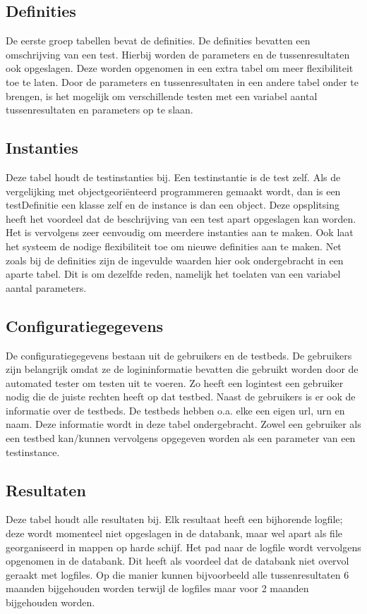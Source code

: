 \subsection{Definities}
\npar
De eerste groep tabellen bevat de definities. De definities bevatten een omschrijving van een test. Hierbij worden de parameters en de tussenresultaten ook opgeslagen. Deze worden opgenomen in een extra tabel om meer flexibiliteit toe te laten. Door de parameters en tussenresultaten in een andere tabel onder te brengen, is het mogelijk om verschillende testen met een variabel aantal tussenresultaten en parameters op te slaan.
\subsection{Instanties}
\npar
Deze tabel houdt de testinstanties bij. Een testinstantie is de test zelf. Als de vergelijking met objectgeori\"enteerd programmeren gemaakt wordt, dan is een testDefinitie een klasse zelf en de instance is dan een object. Deze opsplitsing heeft het voordeel dat de beschrijving van een test apart opgeslagen kan worden. Het is vervolgens zeer eenvoudig om meerdere instanties aan te maken. Ook laat het systeem de nodige flexibiliteit toe om nieuwe definities aan te maken. Net zoals bij de definities zijn de ingevulde waarden hier ook ondergebracht in een aparte tabel. Dit is om dezelfde reden, namelijk het toelaten van een variabel aantal parameters.
\subsection{Configuratiegegevens}
\npar
De configuratiegegevens bestaan uit de gebruikers en de testbeds. De gebruikers zijn belangrijk omdat ze de logininformatie bevatten die gebruikt worden door de automated tester om testen uit te voeren. Zo heeft een logintest een gebruiker nodig die de juiste rechten heeft op dat testbed.
Naast de gebruikers is er ook de informatie over de testbeds. De testbeds hebben o.a. elke een eigen url, urn en naam. Deze informatie wordt in deze tabel ondergebracht. Zowel een gebruiker als een testbed kan/kunnen vervolgens opgegeven worden als een parameter van een testinstance. 
\subsection{Resultaten}
\npar
Deze tabel houdt alle resultaten bij. Elk resultaat heeft een bijhorende logfile; deze wordt momenteel niet opgeslagen in de databank, maar wel apart als file georganiseerd in mappen op harde schijf. Het pad naar de logfile wordt vervolgens opgenomen in de databank. Dit heeft als voordeel dat de databank niet overvol geraakt met logfiles. Op die manier kunnen bijvoorbeeld alle tussenresultaten 6 maanden bijgehouden worden terwijl de logfiles maar voor 2 maanden bijgehouden worden.
\clearpage

